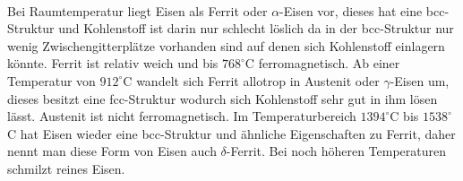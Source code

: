 \documentclass[11pt,a4paper]{article}
\numberwithin{equation}{section}
\numberwithin{figure}{section}
\begin{document}
\\
\begin{addmargin}[25pt]{0pt}
Bei Raumtemperatur liegt Eisen als Ferrit oder $\alpha$-Eisen vor, dieses hat eine bcc-Struktur und Kohlenstoff ist darin nur schlecht löslich da in der bcc-Struktur nur wenig Zwischengitterplätze vorhanden sind auf denen sich Kohlenstoff einlagern könnte. Ferrit ist relativ weich und bis $768^\circ $C ferromagnetisch. Ab einer Temperatur von $912^\circ$C wandelt sich Ferrit allotrop in Austenit oder $\gamma$-Eisen um, dieses besitzt eine fcc-Struktur wodurch sich Kohlenstoff sehr gut in ihm lösen lässt. Austenit ist nicht ferromagnetisch. Im Temperaturbereich $1394^\circ$C bis $1538^\circ$C hat Eisen wieder eine bcc-Struktur und ähnliche Eigenschaften zu Ferrit, daher nennt man diese Form von Eisen auch $\delta$-Ferrit. Bei noch höheren Temperaturen schmilzt reines Eisen.\\
\end{addmargin}
\end{document}
